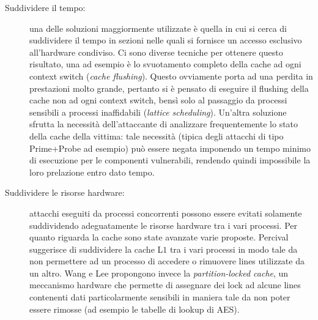 \begin{description}
				\item[Suddividere il tempo:] una delle soluzioni maggiormente utilizzate è quella in cui si cerca di suddividere il tempo in sezioni nelle quali si fornisce un accesso esclusivo all'hardware condiviso. Ci sono diverse tecniche per ottenere questo risultato, una ad esempio è lo svuotamento completo della cache ad ogni context switch (\emph{cache flushing}\cite{zhang2013duppel}). Questo ovviamente porta ad una perdita in prestazioni molto grande, pertanto si è pensato di eseguire il flushing della cache non ad ogni context switch, bensì solo al passaggio da processi sensibili a processi inaffidabili (\emph{lattice scheduling}\cite{denning1976lattice}). Un'altra soluzione \cite{varadarajan2014scheduler} sfrutta la necessità dell'attaccante di analizzare frequentemente lo stato della cache della vittima: tale necessità (tipica degli attacchi di tipo Prime+Probe ad esempio) può essere negata imponendo un tempo minimo di esecuzione per le componenti vulnerabili, rendendo quindi impossibile la loro prelazione entro dato tempo.
				\item[Suddividere le risorse hardware:] attacchi eseguiti da processi concorrenti possono essere evitati solamente suddividendo adeguatamente le risorse hardware tra i vari processi. Per quanto riguarda la cache sono state avanzate varie proposte. Percival\cite{percival2005cache} suggerisce di suddividere la cache L$1$ tra i vari processi in modo tale da non permettere ad un processo di accedere o rimuovere lines utilizzate da un altro. Wang e Lee\cite{wang2007new} propongono invece la \emph{partition-locked cache}, un meccanismo hardware che permette di assegnare dei lock ad alcune lines contenenti dati particolarmente sensibili in maniera tale da non poter essere rimosse (ad esempio le tabelle di lookup di \ac{AES}).				 
			\end{description}
